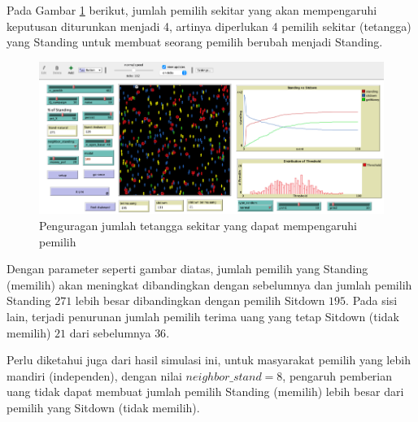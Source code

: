 Pada Gambar \ref{fig:pemilusop12} berikut, jumlah pemilih sekitar yang akan mempengaruhi keputusan diturunkan menjadi 4, artinya diperlukan 4 pemilih sekitar (tetangga) yang Standing untuk membuat seorang pemilih berubah menjadi Standing.

\begin{figure}[H]
\centering
\includegraphics[width=\linewidth]{images/ch03/pemilusop12}
\caption{Penguragan jumlah tetangga sekitar yang dapat mempengaruhi pemilih}
\label{fig:pemilusop12}
\end{figure}

Dengan parameter seperti gambar diatas, jumlah pemilih yang Standing (memilih) akan meningkat dibandingkan dengan sebelumnya dan jumlah pemilih Standing $271$ lebih besar dibandingkan dengan pemilih Sitdown $195$. Pada sisi lain, terjadi penurunan jumlah pemilih terima uang yang tetap Sitdown (tidak memilih) $21$ dari sebelumnya $36$.

Perlu diketahui juga dari hasil simulasi ini, untuk masyarakat pemilih yang lebih mandiri (independen), dengan nilai $neighbor\_stand=8$, pengaruh pemberian uang tidak dapat membuat jumlah pemilih Standing (memilih) lebih besar dari pemilih yang Sitdown (tidak memilih).
